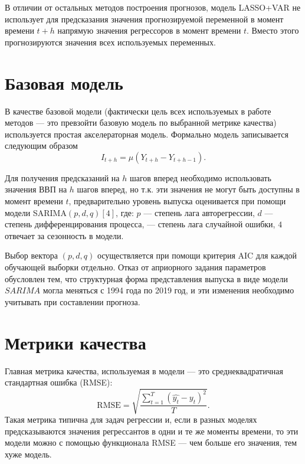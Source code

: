 В отличии от остальных методов построения прогнозов, модель LASSO+VAR не использует для предсказания значения прогнозируемой переменной в момент времени $t+h$ напрямую значения регрессоров в момент времени $t$. Вместо этого прогнозируются значения всех используемых переменных.



\section{Базовая модель}
В качестве базовой модели (фактически цель всех используемых в работе методов --- это превзойти базовую модель по выбранной метрике качества) используется простая акселераторная модель.
Формально модель записывается следующим образом
\begin{equation}
    I_{t+h} =  \mu (Y_{t+h} - Y_{t+h-1}).
\end{equation}

Для получения предсказаний на $h$ шагов вперед необходимо использовать значения ВВП на $h$ шагов вперед, но т.к. эти значения не могут быть доступны в момент времени $t$, предварительно уровень выпуска оценивается при помощи модели SARIMA$(p,d,q)[4]$, где: $p$ --- степень лага авторегрессии, $d$ --- степень дифференцирования процесса, --- степень лага случайной ошибки, $4$ отвечает за сезонность в модели.

Выбор вектора $(p,  d, q)$ осуществляется при помощи критерия AIC для каждой обучающей выборки отдельно. Отказ от априорного задания параметров обусловлен тем, что структурная форма представления выпуска в виде модели $SARIMA$ могла меняться с 1994 года по 2019 год, и эти изменения необходимо учитывать при составлении прогноза.
\section{Метрики качества}
Главная метрика качества, используемая в модели --- это среднеквадратичная стандартная ошибка (RMSE):
\begin{equation}
  \text{RMSE} = \sqrt{ \frac{\sum_{t = 1}^{T} (\hat{y_t} - y_t)^2}{T}}.
\end{equation}
Такая метрика типична для задач регрессии и, если в разных моделях предсказываются значения регрессантов в одни и те же моменты времени, то эти модели можно с помощью функционала RMSE --- чем больше его значения, тем хуже модель.

